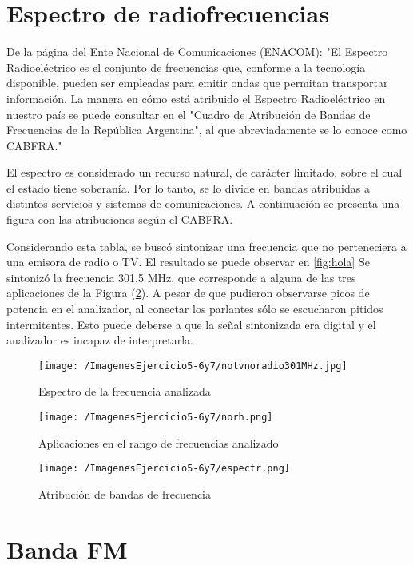 \section{Espectro de radiofrecuencias}
De la página del Ente Nacional de Comunicaciones (ENACOM): "El Espectro Radioeléctrico es el conjunto de frecuencias que, conforme a la tecnología disponible, pueden ser empleadas para emitir ondas que permitan transportar información. La manera en cómo está atribuido el Espectro Radioeléctrico en nuestro país se puede consultar en el "Cuadro de Atribución de Bandas de Frecuencias de la República Argentina", al que abreviadamente se lo conoce como CABFRA."

El espectro es considerado un recurso natural, de carácter limitado,  sobre el cual el estado tiene soberanía. Por lo tanto, se lo divide en bandas atribuidas a distintos servicios y sistemas de comunicaciones. A continuación se presenta una figura con las atribuciones según el CABFRA. 

Considerando esta tabla, se buscó sintonizar una frecuencia que no perteneciera a una emisora de radio o TV. El resultado se puede observar en \ref{fig:hola} Se sintonizó la frecuencia 301.5 MHz, que corresponde a alguna de las tres aplicaciones de la Figura (\ref{fig:noradionitelev}). A pesar de que pudieron observarse picos de potencia en el analizador, al conectar los parlantes sólo se escucharon pitidos intermitentes. Esto puede deberse a que la señal sintonizada era digital y el analizador es incapaz de interpretarla.

\begin{figure}[H]
	\centering
	\texttt{[image: /ImagenesEjercicio5-6y7/notvnoradio301MHz.jpg]}
\caption{Espectro de la frecuencia analizada}
	\label{fig:hello}
\end{figure}

\begin{figure}[H]
	\centering
	\texttt{[image: /ImagenesEjercicio5-6y7/norh.png]}
\caption{Aplicaciones en el rango de frecuencias analizado}
	\label{fig:noradionitelev}
\end{figure}

\begin{figure}[H]
	\centering
	\texttt{[image: /ImagenesEjercicio5-6y7/espectr.png]}
	\caption{Atribución de bandas de frecuencia}
	\label{fig:esqcond}
\end{figure}

\section{Banda FM}

